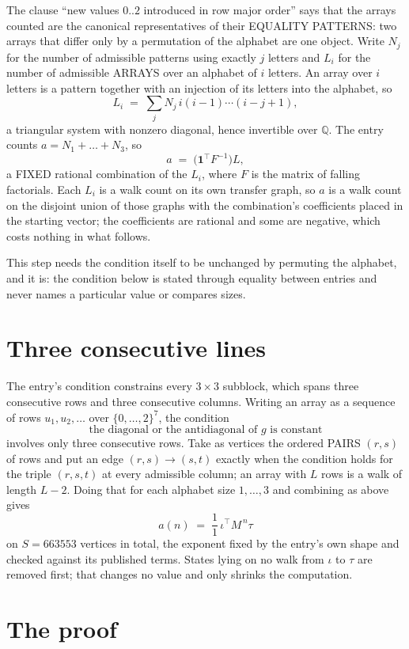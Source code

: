 \documentclass[11pt,a4paper]{article}
\theoremstyle{plain}
\theoremstyle{definition}
\begin{document}
The clause ``new values $0..2$ introduced in row major order'' says that the arrays
counted are the canonical representatives of their EQUALITY PATTERNS: two arrays that differ
only by a permutation of the alphabet are one object. Write $N_j$ for the number of admissible
patterns using exactly $j$ letters and $L_i$ for the number of admissible ARRAYS over an
alphabet of $i$ letters. An array over $i$ letters is a pattern together with an injection of
its letters into the alphabet, so
\[
L_i\;=\;\sum_{j}N_j\,i(i-1)\cdots(i-j+1),
\]
a triangular system with nonzero diagonal, hence invertible over $\mathbb{Q}$. The entry
counts $a=N_1+\dots+N_{3}$, so
\[
a\;=\;\bigl(\mathbf{1}^{\!\top}F^{-1}\bigr)L ,
\]
a FIXED rational combination of the $L_i$, where $F$ is the matrix of falling factorials.
Each $L_i$ is a walk count on its own transfer graph, so $a$ is a walk count on the disjoint
union of those graphs with the combination's coefficients placed in the starting vector; the
coefficients are rational and some are negative, which costs nothing in what follows.

This step needs the condition itself to be unchanged by permuting the alphabet, and it is:
the condition below is stated through equality between entries and never names a particular
value or compares sizes.

\section{Three consecutive lines}

The entry's condition constrains every $3\times3$ subblock, which spans three consecutive
rows and three consecutive columns. Writing an array as a sequence of rows
$u_1,u_2,\dots$ over $\{0,\dots,2\}^{7}$, the condition
\[
\text{the diagonal or the antidiagonal of }g\text{ is constant}
\]
involves only three consecutive rows. Take as vertices the ordered PAIRS $(r,s)$ of
rows and put an edge $(r,s)\to(s,t)$ exactly when the condition holds for the triple
$(r,s,t)$ at every admissible column; an array with $L$ rows is a walk of length $L-2$.
Doing that for each alphabet size $1,\dots,3$ and combining as above gives
\[
a(n)\;=\;\frac{1}{1}\,\iota^{\!\top}M^{\,n}\tau
\]
on $S=663553$ vertices in total, the exponent fixed by the entry's own shape and checked against
its published terms. States lying on no walk from $\iota$ to $\tau$ are removed first; that
changes no value and only shrinks the computation.

\section{The proof}
\end{document}
